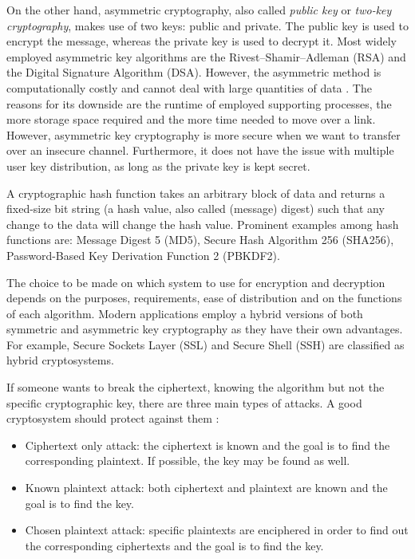 On the other hand, asymmetric cryptography, also called \emph{public key} or \emph{two-key cryptography}, makes use of two keys: public and private. The public key is used to encrypt the message, whereas the private key is used to decrypt it. Most widely employed asymmetric key algorithms are the Rivest–Shamir–Adleman (RSA) and the Digital Signature Algorithm (DSA). However, the asymmetric method is computationally costly and cannot deal with large quantities of data  \cite{wikikey}. The reasons for its downside are the runtime of employed supporting processes, the more storage space required and the more time needed to move over a link. However, asymmetric key cryptography is more secure when we want to transfer over an insecure channel. Furthermore, it does not have the issue with multiple user key distribution, as long as the private key is kept secret.

A cryptographic hash function takes an arbitrary block of data and returns a fixed-size bit string (a hash value, also called (message) digest) such that any change to the data will change the hash value. Prominent examples among hash functions are: Message Digest 5 (MD5), Secure Hash Algorithm 256 (SHA256), Password-Based Key Derivation Function 2 (PBKDF2).

The choice to be made on which system to use for encryption and decryption depends on the purposes, requirements, ease of distribution and on the functions of each algorithm. Modern applications employ a hybrid versions of both symmetric and asymmetric key cryptography as they have their own advantages. For example, Secure Sockets Layer (SSL) and Secure Shell (SSH) are classified as hybrid cryptosystems. 

If someone wants to break the ciphertext, knowing the algorithm but not the specific cryptographic key, there are three main types of attacks. A good cryptosystem should protect against them \cite{stallings2017}:
\begin{itemize}
\item Ciphertext only attack: the ciphertext is known and the goal is to find the corresponding plaintext. If possible, the key may be found as well.
\end{itemize}
\begin{itemize}
\item Known plaintext attack: both ciphertext and plaintext are known and the goal is to find the key.
\end{itemize}
\begin{itemize}
\item Chosen plaintext attack: specific plaintexts are enciphered in order to find out the corresponding ciphertexts and the goal is to find the key.
\end{itemize}




